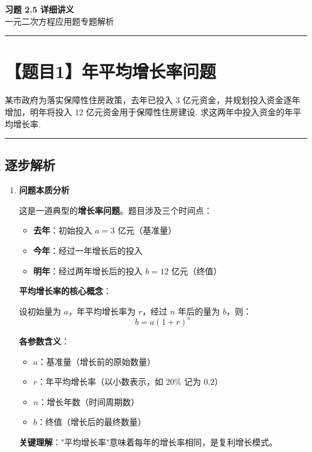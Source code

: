 \documentclass[UTF8]{ctexart}
\newenvironment{redenv}{\color{red}}{}
\newenvironment{detailedanalysis}{%
    \color{red}
    \begin{enumerate}[label=\textbf{第\arabic*步：}, leftmargin=*, align=left, itemsep=1.5ex]
}{%
    \end{enumerate}
}
\newenvironment{conceptbox}{%
    \begin{tcolorbox}[colback=red!5, colframe=red!50!black, title=概念解析, fonttitle=\bfseries]
}{%
    \end{tcolorbox}
}
\newcommand{\problemrule}{\noindent\rule{\textwidth}{1.5pt}\vspace{-0.8em}}
\newcommand{\analysisrule}{\noindent\rule{\textwidth}{0.8pt}\vspace{-0.8em}}
\begin{document}
\begin{center}
    {\LARGE\bfseries\color{bookblue} 习题 2.5 详细讲义}\\[0.5em]
    {\large 一元二次方程应用题专题解析}
\end{center}

\vspace{1em}

\problemrule
\section*{【题目1】年平均增长率问题}
某市政府为落实保障性住房政策，去年已投入 3 亿元资金，并规划投入资金逐年增加，明年将投入 12 亿元资金用于保障性住房建设. 求这两年中投入资金的年平均增长率.

\begin{redenv}
\analysisrule
\subsection*{逐步解析}

\begin{detailedanalysis}
\item \textbf{问题本质分析}

这是一道典型的\textbf{增长率问题}。题目涉及三个时间点：
\begin{itemize}
    \item \textbf{去年}：初始投入 $a = 3$ 亿元（基准量）
    \item \textbf{今年}：经过一年增长后的投入
    \item \textbf{明年}：经过两年增长后的投入 $b = 12$ 亿元（终值）
\end{itemize}

\begin{conceptbox}
\textbf{平均增长率的核心概念}：

设初始量为 $a$，年平均增长率为 $r$，经过 $n$ 年后的量为 $b$，则：
\[
b = a(1+r)^n
\]

\textbf{各参数含义}：
\begin{itemize}
    \item $a$：基准量（增长前的原始数量）
    \item $r$：年平均增长率（以小数表示，如 $20\%$ 记为 $0.2$）
    \item $n$：增长年数（时间周期数）
    \item $b$：终值（增长后的最终数量）
\end{itemize}

\textbf{关键理解}："平均增长率"意味着每年的增长率相同，是复利增长模式。
\end{conceptbox}


\end{detailedanalysis}
\end{redenv}
\end{document}
